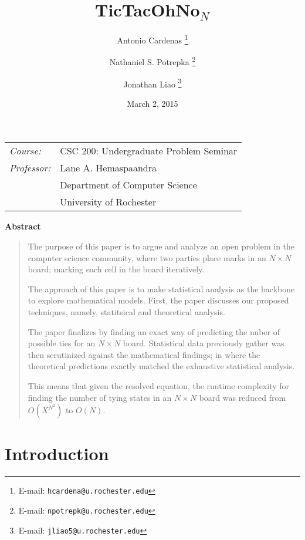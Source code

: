 \documentclass[12pt]{article}
\title{TicTacOhNo$_N$}
\author{
  Antonio Cardenas \thanks{E-mail: \texttt{hcardena@u.rochester.edu}}
  \and
  Nathaniel S. Potrepka \thanks{E-mail: \texttt{npotrepk@u.rochester.edu}}
  \and
  Jonathan Liao \thanks{E-mail: \texttt{jliao5@u.rochester.edu}}
}
\date{March 2, 2015}
\theoremstyle{definition}
\theoremstyle{theorem}
\begin{document}
\sloppy

{
  \singlespacing
  \maketitle
      {
        \centering
        \begin{tabular}{@{}>{\itshape}ll@{}}
          Course: & CSC 200: Undergraduate Problem Seminar \\
          Professor: & Lane A. Hemaspaandra \\
          & Department of Computer Science \\
          & University of Rochester
        \end{tabular}
        \vspace*{0.25in}
        \par
      }
}

\begin{center}
  \bf{Abstract}
\end{center}

\begin{quotation}
  {
    \singlespacing
    \vspace*{-0.25in}
    The purpose of this paper is to argue and analyze an open problem in the computer science community, where two parties place marks in an $N \times N$ board; marking each cell in the board iteratively.

    The approach of this paper is to make statistical analysis as the backbone to explore mathematical models. First, the paper discusses our proposed techniques, namely, statitsical and theoretical analysis.

    The paper finalizes by finding an exact way of predicting the nuber of possible ties for an $N \times N$ board. Statistical data previously gather was then scrutinized against the mathematical findings; in where the theoretical predictions exactly matched the exhaustive statistical analysis.

    This means that given the resolved equation, the runtime complexity for finding the number of tying states in an $N \times N$ board was reduced from $O(X^{N^2})$ to $O(N)$.
  }
\end{quotation}


\section{Introduction}
\end{document}

